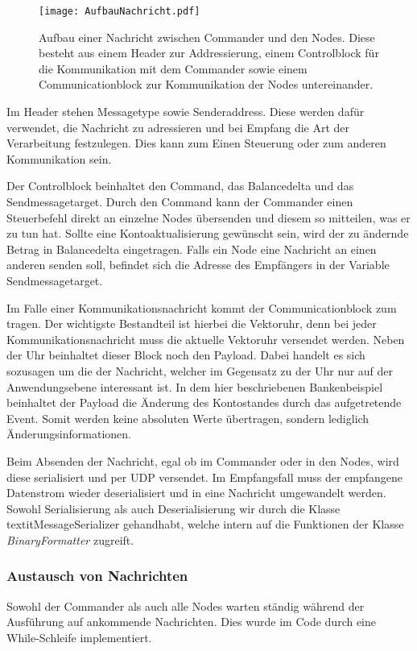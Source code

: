 \begin{figure}[ht]
	\centering
	\texttt{[image: AufbauNachricht.pdf]}
	\caption[Aufbau einer Nachricht]{Aufbau einer Nachricht zwischen Commander und den Nodes. Diese besteht aus einem Header zur Addressierung, einem Controlblock für die Kommunikation mit dem Commander sowie einem Communicationblock zur Kommunikation der Nodes untereinander.}
	\label{figure:aufbauNachricht}
\end{figure}

Im Header stehen Messagetype sowie Senderaddress. Diese werden dafür verwendet, die Nachricht zu adressieren und bei Empfang die Art der Verarbeitung festzulegen. Dies kann zum Einen Steuerung oder zum anderen Kommunikation sein.

Der Controlblock beinhaltet den Command, das Balancedelta und das Sendmessagetarget. Durch den Command kann der Commander einen Steuerbefehl direkt an einzelne Nodes übersenden und diesem so mitteilen, was er zu tun hat. Sollte eine Kontoaktualisierung gewünscht sein, wird der zu ändernde Betrag in Balancedelta eingetragen. Falls ein Node eine Nachricht an einen anderen senden soll, befindet sich die Adresse des Empfängers in der Variable Sendmessagetarget.

Im Falle einer Kommunikationsnachricht kommt der Communicationblock zum tragen. Der wichtigste Bestandteil ist hierbei die Vektoruhr, denn bei jeder Kommunikationsnachricht muss die aktuelle Vektoruhr versendet werden. Neben der Uhr beinhaltet dieser Block noch den Payload. Dabei handelt es sich sozusagen um die  der Nachricht, welcher im Gegensatz zu der Uhr nur auf der Anwendungsebene interessant ist. In dem hier beschriebenen Bankenbeispiel beinhaltet der Payload die Änderung des Kontostandes durch das aufgetretende Event. Somit werden keine absoluten Werte übertragen, sondern lediglich Änderungsinformationen.

Beim Absenden der Nachricht, egal ob im Commander oder in den Nodes, wird diese serialisiert und per UDP versendet. Im Empfangsfall muss der empfangene Datenstrom wieder deserialisiert und in eine Nachricht umgewandelt werden. Sowohl Serialisierung als auch Deserialisierung wir durch die Klasse textit{MessageSerializer} gehandhabt, welche intern auf die Funktionen der Klasse \textit{BinaryFormatter} zugreift.

\FloatBarrier
\subsubsection{Austausch von Nachrichten}
\label{empfangVonNachrichten}
Sowohl der Commander als auch alle Nodes warten ständig während der Ausführung auf ankommende Nachrichten. Dies wurde im Code durch eine While-Schleife implementiert.

